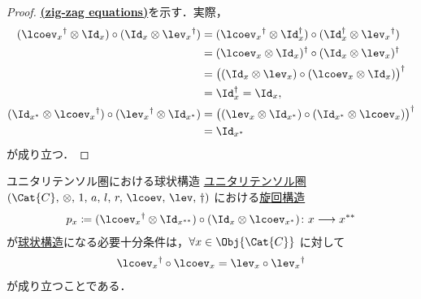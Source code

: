 \documentclass[TQFT_main]{subfiles}
\begin{document}
\begin{proof}
    \hyperref[def:dual]{\textsf{\textbf{(zig-zag equations)}}}を示す．実際，
    \begin{align}
        (\lcoev_x{}^\dagger \otimes \Id_x) \circ (\Id_x \otimes \lev_x{}^\dagger)
        &= (\lcoev_x{}^\dagger \otimes \Id_x^\dagger) \circ (\Id_x^\dagger \otimes \lev_x{}^\dagger) \\
        &= (\lcoev_x \otimes \Id_x)^\dagger \circ (\Id_x \otimes \lev_x)^\dagger \\
        &= \bigl( (\Id_x \otimes \lev_x) \circ (\lcoev_x \otimes \Id_x)\bigr)^\dagger \\
        &= \Id_x^\dagger = \Id_x, \\
        (\Id_{x^*} \otimes \lcoev_x{}^\dagger) \circ (\lev_x{}^\dagger \otimes \Id_{x^*})
        &= \bigl( (\lev_x\otimes \Id_{x^*}) \circ (\Id_{x^*} \otimes \lcoev_x) \bigr)^\dagger \\
        &= \Id_{x^*}
    \end{align}
    が成り立つ．
\end{proof}

\begin{myprop}[label=reprop:spherical-unitary]{ユニタリテンソル圏における球状構造}
    \hyperref[reredef:unitary-monoidal]{ユニタリ}\hyperref[def:tensorfusion-cat]{テンソル圏} $(\Cat{C},\, \otimes,\, 1,\, a,\, l,\, r,\, \lcoev,\, \lev,\, \dagger)$ における\hyperref[def:pivotal]{旋回構造}
    \begin{align}
        p_x \coloneqq (\lcoev_x{}^\dagger \otimes \Id_{x^{**}}) \circ (\Id_x \otimes \lcoev_{x^*}) \colon x \lto x^{**}
    \end{align}
    が\hyperref[def:spherical]{球状構造}になる必要十分条件は，$\forall x \in \Obj{\Cat{C}}$ に対して
    \begin{align}
        \lcoev_x{}^\dagger \circ \lcoev_x = \lev_x \circ \lev_x{}^\dagger
    \end{align}
    が成り立つことである．
\end{myprop}
\end{document}

